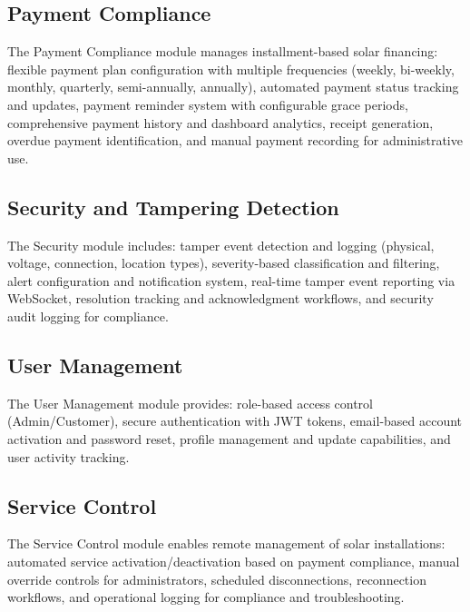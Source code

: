 \subsection{Payment Compliance}
\label{subsec:paymentcompliance}

The Payment Compliance module manages installment-based solar financing: flexible payment plan configuration with multiple frequencies (weekly, bi-weekly, monthly, quarterly, semi-annually, annually), automated payment status tracking and updates, payment reminder system with configurable grace periods, comprehensive payment history and dashboard analytics, receipt generation, overdue payment identification, and manual payment recording for administrative use.



\subsection{Security and Tampering Detection}
\label{subsec:security}

The Security module includes: tamper event detection and logging (physical, voltage, connection, location types), severity-based classification and filtering, alert configuration and notification system, real-time tamper event reporting via WebSocket, resolution tracking and acknowledgment workflows, and security audit logging for compliance.



\subsection{User Management}
\label{subsec:usermanagement}

The User Management module provides: role-based access control (Admin/Customer), secure authentication with JWT tokens, email-based account activation and password reset, profile management and update capabilities, and user activity tracking.



\subsection{Service Control}
\label{subsec:servicecontrol}

The Service Control module enables remote management of solar installations: automated service activation/deactivation based on payment compliance, manual override controls for administrators, scheduled disconnections, reconnection workflows, and operational logging for compliance and troubleshooting.

